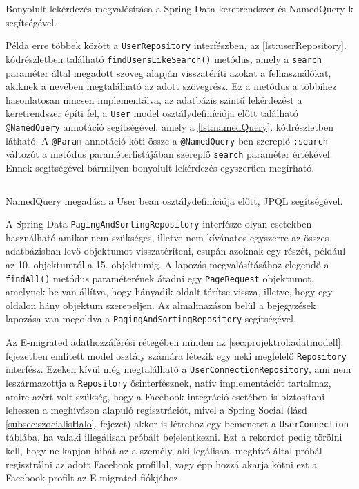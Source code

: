 \begin{reviewed}
\begin{listing}
  \inputminted{java}{progfiles/UserRepository.java}
  \caption{Bonyolult lekérdezés megvalósítása a Spring Data keretrendszer és NamedQuery-k segítségével.}
  \label{lst:userRepository}
\end{listing}


Példa erre többek között a \texttt{UserRepository} interfészben, az \ref{lst:userRepository}. kódrészletben található \texttt{findUsersLikeSearch()} metódus, amely a \texttt{search} paraméter által megadott szöveg alapján visszatéríti azokat a felhasználókat, akiknek a nevében megtalálható az adott szövegrész. Ez a metódus a többihez hasonlatosan nincsen implementálva, az adatbázis szintű lekérdezést a keretrendszer építi fel, a \texttt{User} model osztálydefiníciója előtt található \texttt{@NamedQuery} annotáció segítségével, amely a \ref{lst:namedQuery}. kódrészletben látható. A \texttt{@Param} annotáció köti össze a \texttt{@NamedQuery}-ben szereplő \texttt{:search} változót a metódus paraméterlistájában szereplő \texttt{search} paraméter értékével. Ennek segítségével bármilyen bonyolult lekérdezés egyszerűen megírható. 

\begin{listing}
  \inputminted[fontsize=\small]{java}{progfiles/UserNamedQuery.java}
  \caption{NamedQuery megadása a User bean osztálydefiníciója előtt, JPQL segítségével.}
  \label{lst:namedQuery}
\end{listing}

A Spring Data \texttt{PagingAndSortingRepository} interfésze olyan esetekben használható amikor nem szükséges, illetve nem kívánatos egyszerre az összes adatbázisban levő objektumot visszatéríteni, csupán azoknak egy részét, például az 10. objektumtól a 15. objektumig. A lapozás megvalósításához elegendő a \texttt{findAll()} metódus paraméterének átadni egy \texttt{PageRequest} objektumot, amelynek be van állítva, hogy hányadik oldalt térítse vissza, illetve, hogy egy oldalon hány objektum szerepeljen. Az almalmazáson belül a bejegyzések lapozása van megoldva a \texttt{PagingAndSortingRepository} segítségével.

Az E-migrated adathozzáférési rétegében minden az  \ref{sec:projektrol:adatmodell}. fejezetben említett model osztály  számára létezik egy neki megfelelő \texttt{Repository} interfész. Ezeken kívül még megtalálható a \texttt{UserConnectionRepository}, ami nem leszármazottja a \texttt{Repository} ősinterfésznek, natív implementációt tartalmaz, amire azért volt szükség, hogy a Facebook integráció esetében is biztosítani lehessen a meghíváson alapuló regisztrációt, mivel a Spring Social (lásd \ref{subsec:szocialisHalo}. fejezet) akkor is létrehoz egy bemenetet a \texttt{UserConnection} táblába, ha valaki illegálisan próbált bejelentkezni. Ezt a rekordot pedig törölni kell, hogy ne kapjon hibát az a személy, aki legálisan, meghívó által próbál regisztrálni az adott Facebook profillal, vagy épp hozzá akarja kötni ezt a Facebook profilt az E-migrated fiókjához.


\end{reviewed}
